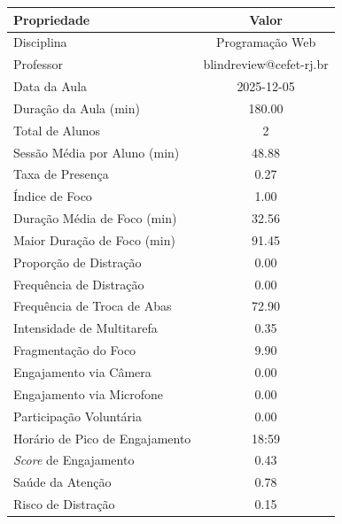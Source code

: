 \begin{table}[H]
    \centering
    \vspace{0.5cm}
    \begin{tabular}{|l|c|}
        \hline
        \textbf{Propriedade} & \textbf{Valor} \\
        \hline
        Disciplina & Programação Web \\
        Professor & blindreview@cefet-rj.br \\
        Data da Aula & 2025-12-05 \\
        Duração da Aula (min) & 180.00 \\
        Total de Alunos & 2 \\
        Sessão Média por Aluno (min) & 48.88 \\
        Taxa de Presença & 0.27 \\
        Índice de Foco & 1.00 \\
        Duração Média de Foco (min) & 32.56 \\
        Maior Duração de Foco (min) & 91.45 \\
        Proporção de Distração & 0.00 \\
        Frequência de Distração & 0.00 \\
        Frequência de Troca de Abas & 72.90 \\
        Intensidade de Multitarefa & 0.35 \\
        Fragmentação do Foco & 9.90 \\
        Engajamento via Câmera & 0.00 \\
        Engajamento via Microfone & 0.00 \\
        Participação Voluntária & 0.00 \\
        Horário de Pico de Engajamento & 18:59 \\
        \textit{Score} de Engajamento & 0.43 \\
        Saúde da Atenção & 0.78 \\
        Risco de Distração & 0.15 \\

\end{tabular}
\end{table}
